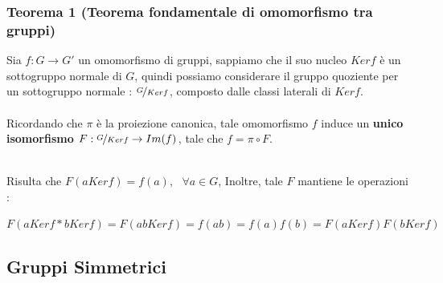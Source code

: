 \documentclass[12pt, letterpaper]{article}
\begin{document}
 \subsubsection{Teorema 1 (Teorema fondamentale di omomorfismo tra gruppi)}
 Sia \(f:G\rightarrow G'\) un omomorfismo di gruppi, sappiamo che il suo 
 nucleo \(Kerf\) è un sottogruppo normale di \(G\), quindi possiamo considerare il gruppo quoziente 
 per un sottogruppo normale : \(\nicefrac{G}{Kerf}\), composto dalle classi laterali di \(Kerf\).\\\hphantom{}\\
 Ricordando che \(\pi\) è la proiezione canonica, tale omomorfismo 
 \(f\) induce un \textbf{unico isomorfismo} \(F:\nicefrac{G}{Kerf}\rightarrow Im(f)\), 
 tale che \(f=\pi \circ F\).
 \begin{figure}[h]
\end{figure}
\\Risulta che \(F(aKerf)=f(a),\text{ }\forall a\in G\), Inoltre,
tale \(F\) mantiene le operazioni :\begin{center} \(F(aKerf*bKerf)=F(abKerf)=f(ab)=f(a)f(b)=F(aKerf)F(bKerf)\)\end{center}
\subsection{Gruppi Simmetrici}
\end{document}
